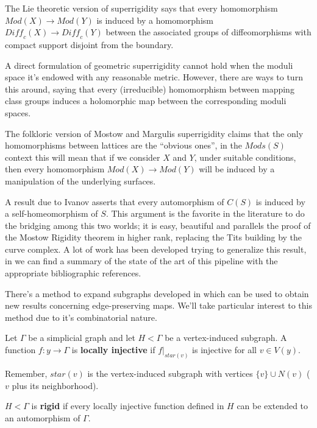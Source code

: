 The Lie theoretic version of superrigidity says that every homomorphism $Mod(X) \to Mod(Y)$ is induced by a homomorphism $\textit{Diff}_{c}(X) \to \textit{Diff}_{c}(Y)$ between the associated groups of diffeomorphisms with compact support disjoint from the boundary.

A direct formulation of geometric superrigidity cannot hold when the moduli space it's endowed with any reasonable metric. However, there are ways to turn this around, saying that every (irreducible) homomorphism between mapping class groups induces a holomorphic map between the corresponding moduli spaces.

The folkloric version of Mostow and Margulis superrigidity claims that the only homomorphisms between lattices are the “obvious ones”, in the $Mods(S)$ context this will mean that if we consider $X$ and $Y$, under suitable conditions, then every homomorphism $Mod(X) \to Mod(Y)$ will be induced by a manipulation of the underlying surfaces. 

A result due to Ivanov asserts that every automorphism of $C(S)$ is induced by a self-homeomorphism of $S$. This argument is the favorite in the literature to do the bridging among this two worlds; it is easy, beautiful and parallels the proof of the Mostow Rigidity theorem in higher rank, replacing the Tits building by the curve complex. A lot of work has been developed trying to generalize this result, in \cite[J. Hernández]{rigidExpJH} we can find a summary of the state of the art of this pipeline with the appropriate bibliographic references. 

There's a method to expand subgraphs developed in \cite[Aramayona, Leininger]{rigidExpJH} which can be used to obtain new results concerning edge-preserving maps. We'll take particular interest to this method due to it's combinatorial nature.

\begin{defini}
Let $\Gamma$ be a simplicial graph and let $H<\Gamma$ be a vertex-induced subgraph. A function $f:y\to \Gamma$ is \textbf{locally injective} if $f|_{star(v)}$ is injective for all $v \in V(y)$. 
\end{defini}

\begin{nota}
Remember, $star(v)$ is the vertex-induced subgraph with vertices $\{ v \} \cup N(v)$ ($v$ plus its neighborhood).
\end{nota}

\begin{defini}
$H<\Gamma$ is \textbf{rigid} if every locally injective function defined in $H$ can be extended to an automorphism of $\Gamma$. \end{defini}

